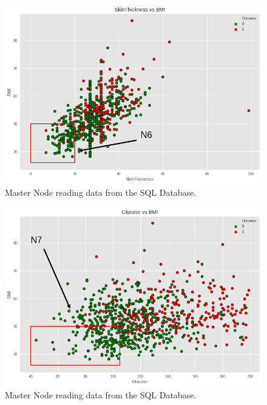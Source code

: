 \documentclass[12pt]{article}
\begin{document}
\begin{figure}[ht]
\centering
\includegraphics[width=1\textwidth]{download(4).png}
\caption{Master Node reading data from the SQL Database.}
\end{figure}

\begin{figure}[ht]
\centering
\includegraphics[width=1\textwidth]{download(5).png}
\caption{Master Node reading data from the SQL Database.}
\end{figure}
\end{document}
